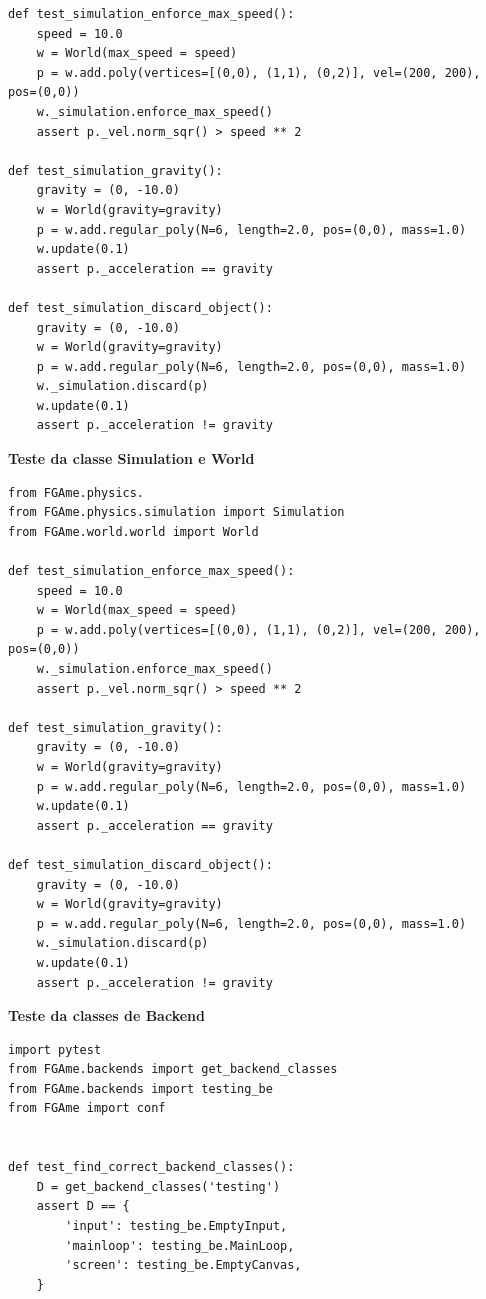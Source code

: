 \begin{anexosenv}
\begin{lstlisting}
def test_simulation_enforce_max_speed():
    speed = 10.0
    w = World(max_speed = speed)
    p = w.add.poly(vertices=[(0,0), (1,1), (0,2)], vel=(200, 200), pos=(0,0))
    w._simulation.enforce_max_speed()
    assert p._vel.norm_sqr() > speed ** 2

def test_simulation_gravity():
    gravity = (0, -10.0)
    w = World(gravity=gravity)
    p = w.add.regular_poly(N=6, length=2.0, pos=(0,0), mass=1.0)
    w.update(0.1)
    assert p._acceleration == gravity

def test_simulation_discard_object():
    gravity = (0, -10.0)
    w = World(gravity=gravity)
    p = w.add.regular_poly(N=6, length=2.0, pos=(0,0), mass=1.0)
    w._simulation.discard(p)
    w.update(0.1)
    assert p._acceleration != gravity
\end{lstlisting}


{\LARGE \textbf{Teste da classe Simulation e World}}

\begin{lstlisting}
from FGAme.physics.
from FGAme.physics.simulation import Simulation
from FGAme.world.world import World

def test_simulation_enforce_max_speed():
    speed = 10.0
    w = World(max_speed = speed)
    p = w.add.poly(vertices=[(0,0), (1,1), (0,2)], vel=(200, 200), pos=(0,0))
    w._simulation.enforce_max_speed()
    assert p._vel.norm_sqr() > speed ** 2

def test_simulation_gravity():
    gravity = (0, -10.0)
    w = World(gravity=gravity)
    p = w.add.regular_poly(N=6, length=2.0, pos=(0,0), mass=1.0)
    w.update(0.1)
    assert p._acceleration == gravity

def test_simulation_discard_object():
    gravity = (0, -10.0)
    w = World(gravity=gravity)
    p = w.add.regular_poly(N=6, length=2.0, pos=(0,0), mass=1.0)
    w._simulation.discard(p)
    w.update(0.1)
    assert p._acceleration != gravity
\end{lstlisting}


{\LARGE \textbf{Teste da classes de Backend}}

\begin{lstlisting}
import pytest
from FGAme.backends import get_backend_classes
from FGAme.backends import testing_be
from FGAme import conf


def test_find_correct_backend_classes():
    D = get_backend_classes('testing')
    assert D == {
        'input': testing_be.EmptyInput,
        'mainloop': testing_be.MainLoop,
        'screen': testing_be.EmptyCanvas,
    }



\end{lstlisting}
\end{anexosenv}

